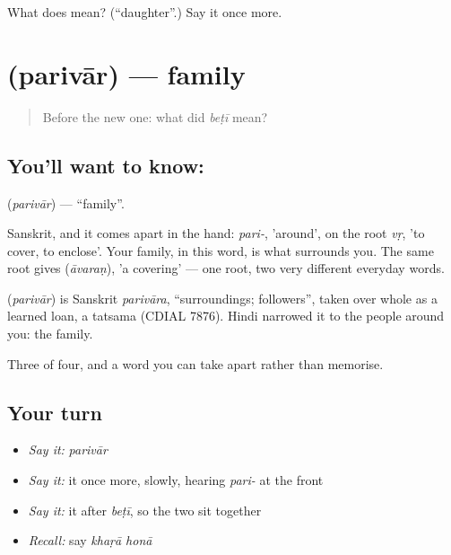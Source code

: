 \begin{tcolorbox}[breakable,colback=teal!4,colframe=teal!35!black,title={Before you move on}]
What does  mean? (\textquotedblleft{}daughter\textquotedblright{}.) Say it once more.
\end{tcolorbox}
\section[\texorpdfstring{\hi{परिवार} (parivār)}{परिवार (parivār)}]{ (parivār) — family}

\label{lesson:HI-C44-family}



\begin{quote}
Before the new one: what did \emph{beṭī} mean?
\end{quote}

\subsection*{You'll want to know: }
\textbf{} (\emph{parivār}) — \textquotedblleft{}family\textquotedblright{}.

Sanskrit, and it comes apart in the hand: \emph{pari-}, 'around', on the root \emph{vṛ}, 'to cover, to enclose'. Your family, in this word, is what surrounds you. The same root gives  (\emph{āvaraṇ}), 'a covering' — one root, two very different everyday words.

\begin{cousinweb}
\textbf{} (\emph{parivār}) is Sanskrit \emph{parivāra}, \textquotedblleft{}surroundings; followers\textquotedblright{}, taken over whole as a learned loan, a tatsama (CDIAL 7876). Hindi narrowed it to the people around you: the family.
\end{cousinweb}

\begin{grammarlens}[title={What you've built}]
Three of four, and a word you can take apart rather than memorise.
\end{grammarlens}

\subsection*{Your turn}
\begin{itemize}
\raggedright
  \item \emph{Say it:} \emph{parivār}
  \item \emph{Say it:} it once more, slowly, hearing \emph{pari-} at the front
  \item \emph{Say it:} it after \emph{beṭī}, so the two sit together
  \item \emph{Recall:} say \emph{khaṛā honā}
\end{itemize}

